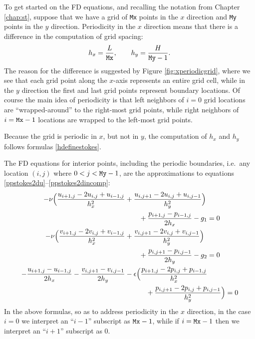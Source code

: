 To get started on the FD equations, and recalling the notation from Chapter \ref{chap:st}, suppose that we have a grid of \texttt{Mx} points in the $x$ direction and \texttt{My} points in the $y$ direction.  Periodicity in the $x$ direction means that there is a difference in the computation of grid spacing:
\begin{equation}
h_x = \frac{L}{\text{\texttt{Mx}}}, \qquad h_y = \frac{H}{\text{\texttt{My}}-1}. \label{hdefinestokes}
\end{equation}
The reason for the difference is suggested by Figure \ref{fig:xperiodicgrid}, where we see that each grid point along the $x$-axis represents an entire grid cell, while in the $y$ direction the first and last grid points represent boundary locations.  Of course the main idea of periodicity is that left neighbors of $i=0$ grid locations are ``wrapped-around'' to the right-most grid points, while right neighbors of $i=\text{\texttt{Mx}}-1$ locations are wrapped to the left-most grid points.

\begin{marginfigure}

\caption{Because the grid is periodic in $x$, but not in $y$, the computation of $h_x$ and $h_y$ follows formulas \eqref{hdefinestokes}.}
\label{fig:xperiodicgrid}
\end{marginfigure}

The FD equations for interior points, including the periodic boundaries, i.e.~any location $(i,j)$ where $0 < j < \text{\texttt{My}}-1$, are the approximations to equations \eqref{ppstokes2du}--\eqref{ppstokes2dincomp}:
\begin{align}
-\nu \Big(\frac{u_{i+1,j} - 2 u_{i,j} + u_{i-1,j}}{h_x^2} &+ \frac{u_{i,j+1} - 2 u_{i,j} + u_{i,j-1}}{h_y^2}\Big) \notag \\
&\qquad + \frac{p_{i+1,j}-p_{i-1,j}}{2h_x} - g_1 = 0 \label{fdstokes2du} \\
-\nu \Big(\frac{v_{i+1,j} - 2 v_{i,j} + v_{i-1,j}}{h_x^2} &+ \frac{v_{i,j+1} - 2 v_{i,j} + v_{i,j-1}}{h_y^2}\Big) \notag \\
&\qquad + \frac{p_{i,j+1}-p_{i,j-1}}{2h_y} - g_2 = 0 \label{fdstokes2dv} \\
- \frac{u_{i+1,j}-u_{i-1,j}}{2h_x} - \frac{v_{i,j+1}-v_{i,j-1}}{2h_y} &- \epsilon \Big(\frac{p_{i+1,j} - 2 p_{i,j} + p_{i-1,j}}{h_x^2} \notag \\
&\qquad\quad + \frac{p_{i,j+1} - 2 p_{i,j} + p_{i,j-1}}{h_y^2}\Big) = 0 \label{fdstokes2dincomp}
\end{align}
In the above formulas, so as to address periodicity in the $x$ direction, in the case $i=0$ we interpret an ``$i-1$'' subscript as $\text{\texttt{Mx}}-1$, while if $i=\text{\texttt{Mx}}-1$ then we interpret an ``$i+1$'' subscript as $0$.

